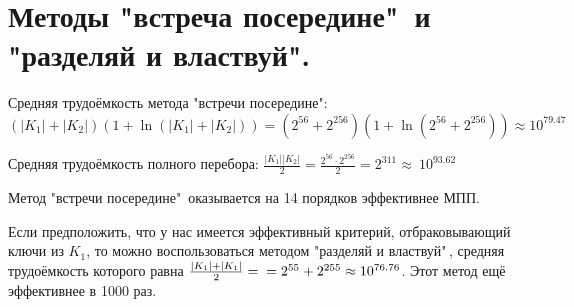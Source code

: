 \section{Методы "встреча посередине"\ и "разделяй и властвуй".}


Средняя трудоёмкость метода "встречи посередине":
$$(|K_1| + |K_2|)(1 + \ln(|K_1| + |K_2|)) = (2^{56} + 2^{256})(1 + \ln(2^{56} + 2^{256})) \approx 10 ^ {79.47}$$

\noindent Средняя трудоёмкость полного перебора: $\frac{|K_1||K_2|}{2} = \frac{2^{56} \cdot 2^{256}}{2} = 2^{311} \approx~10 ^ {93.62}$

Метод "встречи посередине"\ оказывается на 14 порядков эффективнее МПП.

Если предположить, что у нас имеется эффективный критерий, отбраковывающий ключи из $K_1$, то можно воспользоваться методом "разделяй и властвуй"\,, средняя трудоёмкость которого равна $\frac{|K_1| + |K_1|}{2} = \\ = 2^{55} + 2^{255} \approx 10 ^ {76.76}$. Этот метод ещё эффективнее в 1000 раз.

